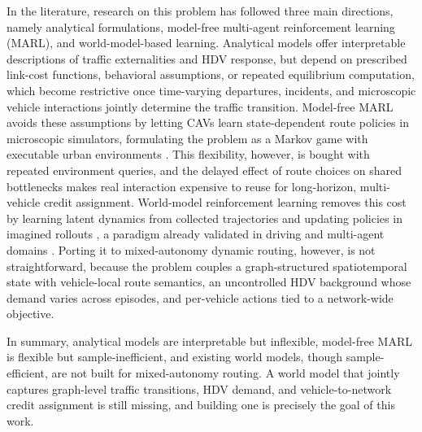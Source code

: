 In the literature, research on this problem has followed three main directions, namely analytical formulations, model-free multi-agent reinforcement learning (MARL), and world-model-based learning. Analytical models \cite{tanaka2020linearly,cabannes2022solving,kolarich2022stackelberg} offer interpretable descriptions of traffic externalities and HDV response, but depend on prescribed link-cost functions, behavioral assumptions, or repeated equilibrium computation, which become restrictive once time-varying departures, incidents, and microscopic vehicle interactions jointly determine the traffic transition.
Model-free MARL avoids these assumptions by letting CAVs learn state-dependent route policies in microscopic simulators, formulating the problem as a Markov game with executable urban environments \cite{lazar2021learning,shou2022multi,akman2025routerl,akman2026urb}. This flexibility, however, is bought with repeated environment queries, and the delayed effect of route choices on shared bottlenecks makes real interaction expensive to reuse for long-horizon, multi-vehicle credit assignment.
World-model reinforcement learning removes this cost by learning latent dynamics from collected trajectories and updating policies in imagined rollouts \cite{hafnerdream,hafnermastering,hafner2025mastering}, a paradigm already validated in driving and multi-agent domains \cite{mamba,li2024think2drive,yang2026raw2drive}. Porting it to mixed-autonomy dynamic routing, however, is not straightforward, because the problem couples a graph-structured spatiotemporal state with vehicle-local route semantics, an uncontrolled HDV background whose demand varies across episodes, and per-vehicle actions tied to a network-wide objective.

In summary, analytical models are interpretable but inflexible, model-free MARL is flexible but sample-inefficient, and existing world models, though sample-efficient, are not built for mixed-autonomy routing. A world model that jointly captures graph-level traffic transitions, HDV demand, and vehicle-to-network credit assignment is still missing, and building one is precisely the goal of this work.


